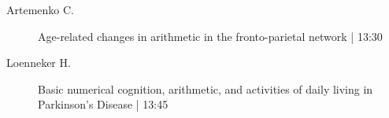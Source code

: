 \begin{symposium}
\begin{description}
                \item [ Artemenko C.] Age-related changes in arithmetic in the fronto-parietal network \textcolor{mygray}{ | 13:30}    
                
                \item [ Loenneker H.] Basic numerical cognition, arithmetic, and activities of daily living in Parkinson’s Disease \textcolor{mygray}{ | 13:45}    
                
            \end{description} 
            \end{symposium}
            